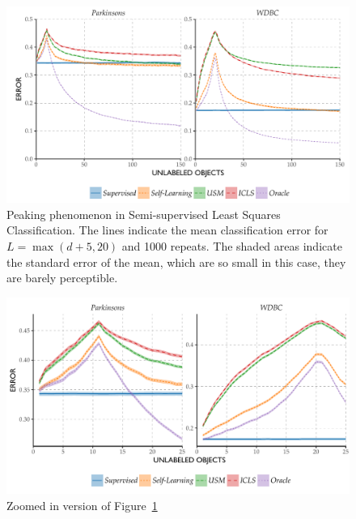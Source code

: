 \documentclass[twoside]{memoir}\usepackage[]{graphicx}\usepackage{xcolor}
\makeatletter
\def\maxwidth{ %
  \ifdim\Gin@nat@width>\linewidth
    \linewidth
  \else
    \Gin@nat@width
  \fi
}
\newenvironment{knitrout}{}{} %
\newcommand{\featdim}{d}
\newcommand{\Nlab}{L}
\makeatother
\begin{document}
\begin{knitrout}
\color{fgcolor}\begin{figure}
\includegraphics[width=\maxwidth]{figure/peaking-icls-1} \caption[Peaking phenomenon in Semi-supervised Least Squares Classification]{Peaking phenomenon in Semi-supervised Least Squares Classification. The lines indicate the mean classification error for $\Nlab=\max(\featdim+5,20)$ and 1000 repeats. The shaded areas indicate the standard error of the mean, which are so small in this case, they are barely perceptible.}\label{fig:peaking-icls}
\end{figure}


\end{knitrout}


\begin{knitrout}
\color{fgcolor}\begin{figure}
\includegraphics[width=\maxwidth]{figure/peakingzoom-1} \caption{Zoomed in version of Figure~\ref{fig:peaking-icls}}\label{fig:peakingzoom}
\end{figure}


\end{knitrout}
\end{document}
